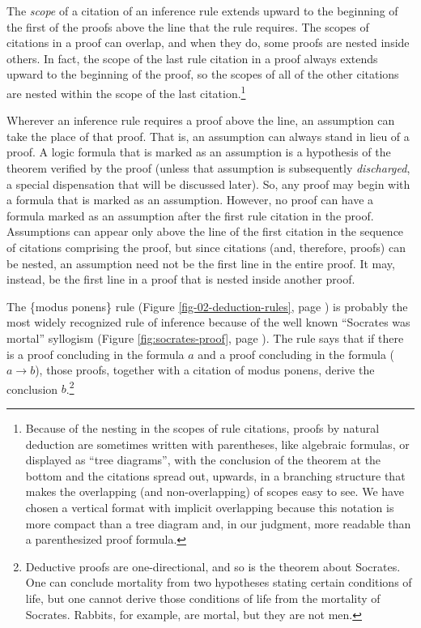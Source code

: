 The \emph{scope} of a
citation
of an inference rule
extends upward to the beginning of the first of the proofs
above the line that the rule requires.
The scopes of citations in a proof can overlap,
and when they do, some proofs are nested inside others.
In fact, the scope of the last rule citation in a proof
always extends upward to the beginning of the proof,
so the scopes of all of the other citations are nested
within the scope of the last citation.\footnote{Because
of the nesting in the scopes of rule citations,
proofs by natural deduction
are sometimes written with parentheses,
like algebraic formulas,
or displayed as ``tree diagrams'',
with the conclusion of the theorem at the bottom and
the citations spread out, upwards,
in a branching structure
that makes the overlapping (and non-overlapping)
of scopes easy to see.
We have chosen a vertical format with implicit
overlapping because this notation is more compact than a
tree
diagram and, in our judgment,
more readable than a parenthesized proof formula.}

Wherever an inference rule requires a proof above the line,
an assumption can take the place of that proof.
That is,
an assumption can always stand in lieu of a proof.
A logic formula that is marked as an assumption
is a hypothesis of the theorem verified by the proof
(unless that assumption is subsequently \emph{discharged},
a special dispensation
that will be discussed later).
So, any proof may begin with a formula
that is marked as an assumption.
However, no proof can have
a formula marked as an assumption after
the first rule citation in the proof.
Assumptions
can appear only above the line
of the first citation in the sequence of citations
comprising the proof, but since citations
(and, therefore, proofs) can be nested,
an assumption need not be the first line in
the entire proof.
It may, instead, be the first line
in a proof that is nested inside another proof.

The \{modus ponens\} rule
(Figure \ref{fig-02-deduction-rules}, page \pageref{fig-02-deduction-rules})
is probably the most widely recognized rule of inference because
of the well known ``Socrates was mortal'' syllogism
(Figure \ref{fig:socrates-proof}, page \pageref{fig:socrates-proof}).
The rule says that if there is a proof concluding in
the formula $a$ and a proof concluding in the formula ($a \rightarrow b$),
those proofs, together with a citation of modus ponens,
derive the conclusion $b$.\footnote{Deductive
proofs are one-directional,
and so is the theorem about Socrates.
One can conclude mortality from two hypotheses stating certain conditions of life,
but one cannot derive those conditions of life from the mortality of Socrates.
Rabbits, for example, are mortal, but they are not men.}

